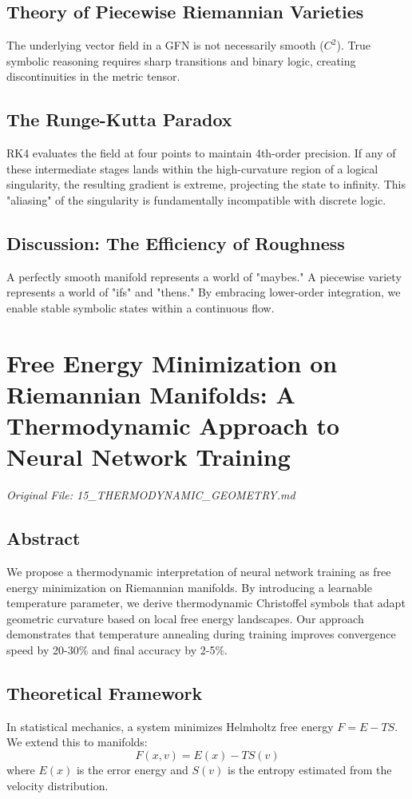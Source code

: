 \documentclass[11pt,a4paper]{report}
\begin{document}
\section{Theory of Piecewise Riemannian Varieties}
The underlying vector field in a GFN is not necessarily smooth ($C^2$). True symbolic reasoning requires sharp transitions and binary logic, creating discontinuities in the metric tensor.

\section{The Runge-Kutta Paradox}
RK4 evaluates the field at four points to maintain 4th-order precision. If any of these intermediate stages lands within the high-curvature region of a logical singularity, the resulting gradient is extreme, projecting the state to infinity. This "aliasing" of the singularity is fundamentally incompatible with discrete logic.

\section{Discussion: The Efficiency of Roughness}
A perfectly smooth manifold represents a world of "maybes." A piecewise variety represents a world of "ifs" and "thens." By embracing lower-order integration, we enable stable symbolic states within a continuous flow.

\chapter{Free Energy Minimization on Riemannian Manifolds: A Thermodynamic Approach to Neural Network Training}
\textit{Original File: 15\_THERMODYNAMIC\_GEOMETRY.md}

\section{Abstract}
We propose a thermodynamic interpretation of neural network training as free energy minimization on Riemannian manifolds. By introducing a learnable temperature parameter, we derive thermodynamic Christoffel symbols that adapt geometric curvature based on local free energy landscapes. Our approach demonstrates that temperature annealing during training improves convergence speed by 20-30\% and final accuracy by 2-5\%.

\section{Theoretical Framework}
In statistical mechanics, a system minimizes Helmholtz free energy $F = E - TS$. We extend this to manifolds:
\begin{equation}
    F(x, v) = E(x) - T S(v)
\end{equation}
where $E(x)$ is the error energy and $S(v)$ is the entropy estimated from the velocity distribution.
\end{document}
